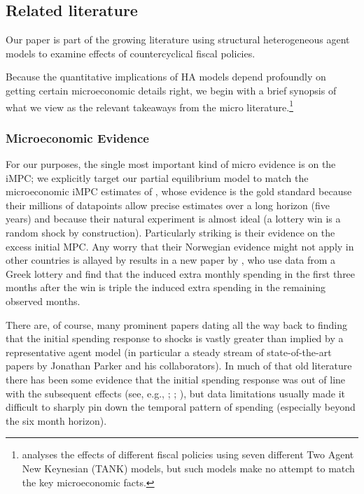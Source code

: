 \documentclass[\econtexRoot/HAFiscal]{subfiles}
\begin{document}
\hypertarget{related-literature}{}\par\subsection{Related literature}
\notinsubfile{\label{sec:lit}}


Our paper is part of the growing literature using structural heterogeneous agent models to examine effects of countercyclical fiscal policies.

Because the quantitative implications of HA models depend profoundly on getting certain microeconomic details right, we begin with a brief synopsis of what we view as the relevant takeaways from the micro literature.\footnote{\cite{coenen2012effects} analyses the effects of different fiscal policies using seven different Two Agent New Keynesian (TANK) models, but such models make no attempt to match the key microeconomic facts.} %

\hypertarget{microeconomic-evidence}{}
\subsubsection{Microeconomic Evidence}
For our purposes, the single most important kind of micro evidence is on the iMPC; we explicitly target our partial equilibrium model to match the microeconomic iMPC estimates of \cite{fagereng_mpc_2021}, whose evidence is the gold standard because their millions of datapoints allow precise estimates over a long horizon (five years) and because their natural experiment is almost ideal (a lottery win is a random shock by construction).  Particularly striking is their evidence on the excess initial MPC.  Any worry that their Norwegian evidence might not apply in other countries is allayed by results in a new paper by \cite{kotsogiannisMPCs}, who use data from a Greek lottery and find that the induced extra monthly spending in the first three months after the win is triple the induced extra spending in the remaining observed months.

There are, of course, many prominent papers dating all the way back to \cite{friedman:windfalls} finding that the initial spending response to shocks is vastly greater than implied by a representative agent model (in particular a steady stream of state-of-the-art papers by Jonathan Parker and his collaborators). In much of that old literature there has been some evidence that the initial spending response was out of line with the subsequent effects (see, e.g., \cite{parker2013consumer}; \cite{broda2014economic}; \cite{jpsTax}), but data limitations usually made it difficult to sharply pin down the temporal pattern of spending (especially beyond the six month horizon).
\end{document}
